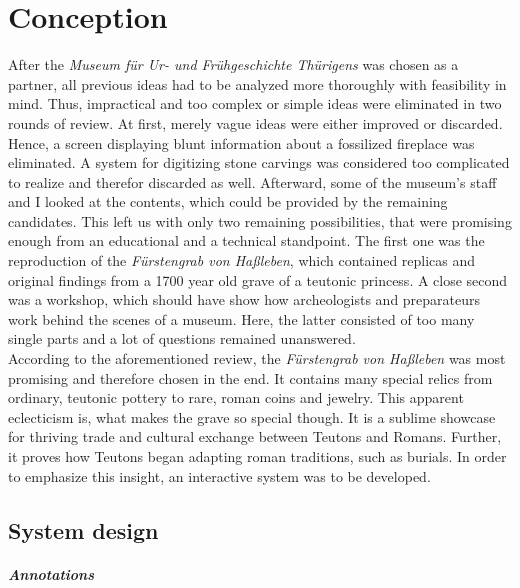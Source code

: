 \chapter{Conception}
\label{conception}

After the \textit{Museum für Ur- und Frühgeschichte Thürigens} was chosen as a partner, all previous ideas had to be analyzed more thoroughly with feasibility in mind. Thus, impractical and too complex or simple ideas were eliminated in two rounds of review. At first, merely vague ideas were either improved or discarded. Hence, a screen displaying blunt information about a fossilized fireplace was eliminated. A system for digitizing stone carvings was considered too complicated to realize and therefor discarded as well. Afterward, some of the museum's staff and I looked at the contents, which could be provided by the remaining candidates. This left us with only two remaining possibilities, that were promising enough from an educational and a technical standpoint. The first one was the reproduction of the \textit{Fürstengrab von Haßleben}, which contained replicas and original findings from a 1700 year old grave of a teutonic princess. A close second was a workshop, which should have show how archeologists and preparateurs work behind the scenes of a museum. Here, the latter consisted of too many single parts and a lot of questions remained unanswered.
\\
According to the aforementioned review, the \textit{Fürstengrab von Haßleben} was most promising and therefore chosen in the end. It contains many special relics from ordinary, teutonic pottery to rare, roman coins and jewelry. This apparent eclecticism is, what makes the grave so special though. It is a sublime showcase for thriving trade and cultural exchange between Teutons and Romans. Further, it proves how Teutons began adapting roman traditions, such as burials. In order to emphasize this insight, an interactive system was to be developed.


\section{System design}
\label{conception_system}

\paragraph{Annotations}

